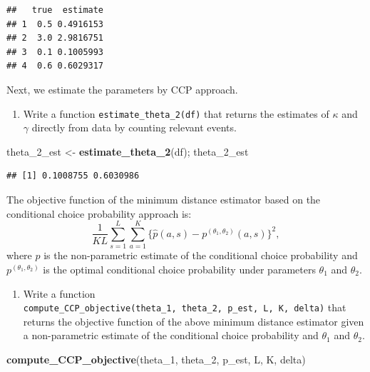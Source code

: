 \documentclass[]{book}
\newenvironment{Shaded}{\begin{snugshade}}{\end{snugshade}}
\newcommand{\KeywordTok}[1]{\textcolor[rgb]{0.13,0.29,0.53}{\textbf{#1}}}
\newcommand{\DecValTok}[1]{\textcolor[rgb]{0.00,0.00,0.81}{#1}}
\newcommand{\StringTok}[1]{\textcolor[rgb]{0.31,0.60,0.02}{#1}}
\newcommand{\NormalTok}[1]{#1}
\providecommand{\tightlist}{%
  \setlength{\itemsep}{0pt}\setlength{\parskip}{0pt}}
\begin{document}
\begin{verbatim}
##   true  estimate
## 1  0.5 0.4916153
## 2  3.0 2.9816751
## 3  0.1 0.1005993
## 4  0.6 0.6029317
\end{verbatim}

Next, we estimate the parameters by CCP approach.

\begin{enumerate}
\def\labelenumi{\arabic{enumi}.}
\setcounter{enumi}{4}
\tightlist
\item
  Write a function \texttt{estimate\_theta\_2(df)} that returns the
  estimates of \(\kappa\) and \(\gamma\) directly from data by counting
  relevant events.
\end{enumerate}

\begin{Shaded}
\begin{Highlighting}[]
\NormalTok{theta_2_est <-}\StringTok{ }\KeywordTok{estimate_theta_2}\NormalTok{(df); theta_2_est}
\end{Highlighting}
\end{Shaded}

\begin{verbatim}
## [1] 0.1008755 0.6030986
\end{verbatim}

The objective function of the minimum distance estimator based on the
conditional choice probability approach is: \[
\frac{1}{KL}\sum_{s = 1}^L \sum_{a = 1}^K\{\hat{p}(a, s) - p^{(\theta_1, \theta_2)}(a, s)\}^2,
\] where \(\hat{p}\) is the non-parametric estimate of the conditional
choice probability and \(p^{(\theta_1, \theta_2)}\) is the optimal
conditional choice probability under parameters \(\theta_1\) and
\(\theta_2\).

\begin{enumerate}
\def\labelenumi{\arabic{enumi}.}
\setcounter{enumi}{5}
\tightlist
\item
  Write a function
  \texttt{compute\_CCP\_objective(theta\_1,\ theta\_2,\ p\_est,\ L,\ K,\ delta)}
  that returns the objective function of the above minimum distance
  estimator given a non-parametric estimate of the conditional choice
  probability and \(\theta_1\) and \(\theta_2\).
\end{enumerate}

\begin{Shaded}
\begin{Highlighting}[]
\KeywordTok{compute_CCP_objective}\NormalTok{(theta_}\DecValTok{1}\NormalTok{, theta_}\DecValTok{2}\NormalTok{, p_est, L, K, delta)}
\end{Highlighting}
\end{Shaded}
\end{document}

